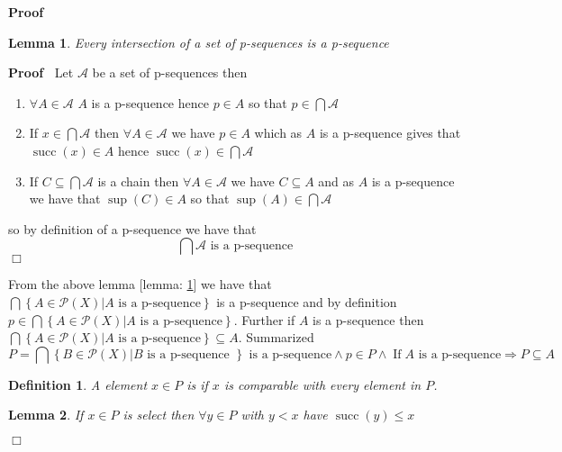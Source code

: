 \documentclass{book}
\newcommand{\tmop}[1]{\ensuremath{\operatorname{#1}}}
\newcommand{\tmtextbf}[1]{\text{{\bfseries{#1}}}}
\newenvironment{proof}{\noindent\textbf{Proof\ }}{\hspace*{\fill}$\Box$\medskip}
\newtheorem{definition}{Definition}
{\theorembodyfont{\rmfamily}\newtheorem{example}{Example}}
\newtheorem{lemma}{Lemma}
\begin{document}
\begin{proof}
  \begin{lemma}
    \label{choice intersection of p-sewuences}Every intersection of a set of
    p-sequences is a p-sequence
  \end{lemma}
  
  \begin{proof}
    Let $\mathcal{A}$ be a set of p-sequences then
    \begin{enumerate}
      \item $\forall A \in \mathcal{A}$ $A$ is a p-sequence hence $p \in A$ so
      that $p \in \bigcap \mathcal{A}$
      
      \item If $x \in \bigcap \mathcal{A}$ then $\forall A \in \mathcal{A}$ we
      have $p \in A$ which as $A$ is a p-sequence gives that $\tmop{succ} (x)
      \in A$ hence $\tmop{succ} (x) \in \bigcap \mathcal{A}$
      
      \item If $C \subseteq \bigcap \mathcal{A}$ is a chain then $\forall A
      \in \mathcal{A}$ we have $C \subseteq A$ and as $A$ is a p-sequence we
      have that $\sup (C) \in A$ so that $\sup (A) \in \bigcap \mathcal{A}$
    \end{enumerate}
    so by definition of a p-sequence we have that
    \[ \bigcap \mathcal{A} \text{ is a p-sequence} \]
  \end{proof}
  
  From the above lemma [lemma: \ref{choice intersection of p-sewuences}] we
  have that $\bigcap \left\{ A \in \mathcal{P} (X) |A \text{ is a p-sequence}
  \right\}$ is a p-sequence and by definition $p \in \bigcap \left\{ A \in
  \mathcal{P} (X) |A \text{ is a p-sequence} \right\}$. Further if $A$ is a
  p-sequence then $\bigcap \left\{ A \in \mathcal{P} (X) |A \text{ is a
  p-sequence} \right\} \subseteq A$. Summarized
  \begin{equation}
    \label{eq 3.59.018} P = \bigcap \left\{ B \in \mathcal{P} (X) |B \text{ is
    a p-sequence } \right\} \text{ is a p-sequence} \wedge p \in P \wedge
    \text{} \tmop{If} A \text{ is a p-sequence} \Rightarrow P \subseteq A
  \end{equation}
  \begin{definition}
    A element $x \in P$ is \tmtextbf{select }if $x$ is comparable with every
    element in $P$. 
  \end{definition}
  
  \begin{lemma}
    \label{choice lemma property of select elements}If $x \in P$ is select
    then $\forall y \in P$ with $y < x$ have $\tmop{succ} (y) \leqslant x$
  \end{lemma}
  

\end{proof}
\end{document}
